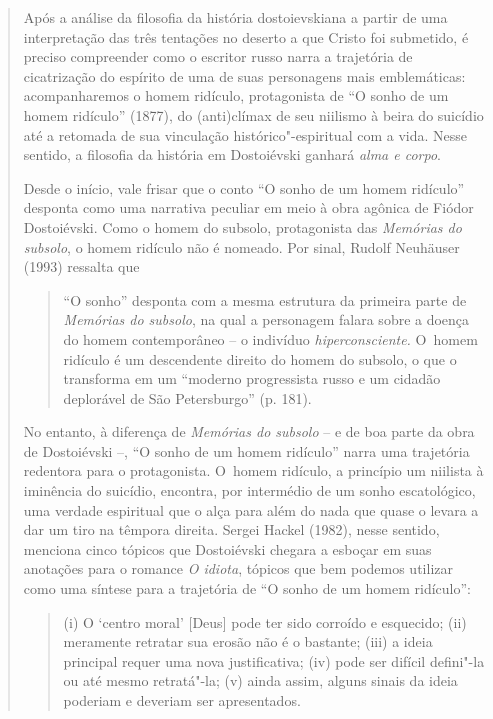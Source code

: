 {\begin{quote}
Após a análise da filosofia da história dostoievskiana a partir de uma
interpretação das três tentações no deserto a que Cristo foi submetido,
é preciso compreender como o escritor russo narra a trajetória de
cicatrização do espírito de uma de suas personagens mais emblemáticas:
acompanharemos o homem ridículo, protagonista de ``O sonho de um homem
ridículo'' (1877), do (anti)clímax de seu niilismo à beira do suicídio
até a retomada de sua vinculação histórico"-espiritual com a vida. Nesse
sentido, a filosofia da história em Dostoiévski ganhará \emph{alma e
corpo}.

Desde o início, vale frisar que o conto ``O sonho de um homem ridículo''
desponta como uma narrativa peculiar em meio à obra agônica de Fiódor
Dostoiévski. Como o homem do subsolo, protagonista das \emph{Memórias do
subsolo}, o homem ridículo não é nomeado. Por sinal, Rudolf Neuhäuser
(1993) ressalta que

\begin{quote}
``O sonho'' desponta com a mesma estrutura da primeira parte de
\emph{Memórias do subsolo}, na qual a personagem falara sobre a doença
do homem contemporâneo -- o indivíduo \emph{hiperconsciente.} O~homem
ridículo é um descendente direito do homem do subsolo, o que o
transforma em um ``moderno progressista russo e um cidadão deplorável de
São Petersburgo'' (p. 181).
\end{quote}

No entanto, à diferença de \emph{Memórias do subsolo} -- e de boa parte
da obra de Dostoiévski --, ``O sonho de um homem ridículo'' narra uma
trajetória redentora para o protagonista. O~homem ridículo, a princípio
um niilista à iminência do suicídio, encontra, por intermédio de um
sonho escatológico, uma verdade espiritual que o alça para além do nada
que quase o levara a dar um tiro na têmpora direita. Sergei Hackel
(1982), nesse sentido, menciona cinco tópicos que Dostoiévski chegara a
esboçar em suas anotações para o romance \emph{O idiota}, tópicos que
bem podemos utilizar como uma síntese para a trajetória de ``O sonho de
um homem ridículo'':

\begin{quote}
(i) O `centro moral' {[}Deus{]} pode ter sido corroído e esquecido; (ii)
meramente retratar sua erosão não é o bastante; (iii) a ideia principal
requer uma nova justificativa; (iv) pode ser difícil defini"-la ou até
mesmo retratá"-la; (v) ainda assim, alguns sinais da ideia poderiam e
deveriam ser apresentados.
\end{quote}


\end{quote}}
